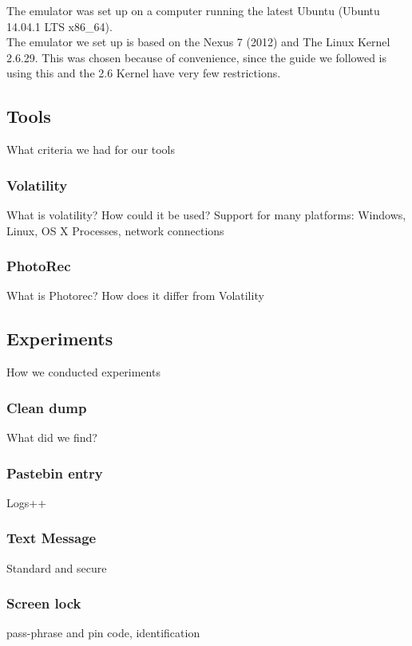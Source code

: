 The emulator was set up on a computer running the latest Ubuntu (Ubuntu 14.04.1 LTS x86\_64).\\
The emulator we set up is based on the Nexus 7 (2012) and The Linux Kernel 2.6.29. This was chosen because of 
convenience, since the guide we followed is using this and the 2.6 Kernel have very few restrictions.
\subsection{Tools}
What criteria we had for our tools
  \subsubsection{Volatility}
  What is volatility? How could it be used?
  Support for many platforms: Windows, Linux, OS X
  Processes, network connections
  \subsubsection{PhotoRec}
  What is Photorec? How does it differ from Volatility
\subsection{Experiments}
How we conducted experiments
  \subsubsection{Clean dump}
  What did we find?
  \subsubsection{Pastebin entry}
  Logs++
  \subsubsection{Text Message}
  Standard and secure
  \subsubsection{Screen lock}
  pass-phrase and pin code, identification

